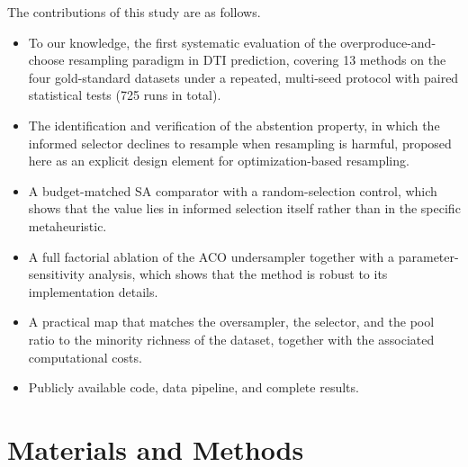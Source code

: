 \documentclass[pdflatex,sn-basic]{sn-jnl}
\begin{document}
The contributions of this study are as follows.
\begin{itemize}
  \item To our knowledge, the first systematic evaluation of the
        overproduce-and-choose resampling paradigm in DTI prediction,
        covering 13 methods on the four gold-standard datasets under a
        repeated, multi-seed protocol with paired statistical tests
        (725 runs in total).
  \item The identification and verification of the abstention property,
        in which the informed selector declines to resample when
        resampling is harmful, proposed here as an explicit design
        element for optimization-based resampling.
  \item A budget-matched SA comparator with a random-selection control,
        which shows that the value lies in informed selection itself
        rather than in the specific metaheuristic.
  \item A full factorial ablation of the ACO undersampler together with
        a parameter-sensitivity analysis, which shows that the method is
        robust to its implementation details.
  \item A practical map that matches the oversampler, the selector, and
        the pool ratio to the minority richness of the dataset, together
        with the associated computational costs.
  \item Publicly available code, data pipeline, and complete results.
\end{itemize}

\section{Materials and Methods}
\end{document}
